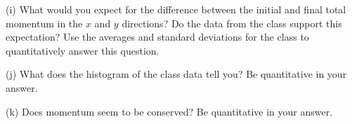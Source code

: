 (i) What would you expect for the difference between the initial and final total momentum in the $x$ and $y$ directions?
Do the data from the class support this expectation? 
Use the averages and standard deviations for the class to quantitatively answer this question.
\vspace{20mm}

(j) What does the histogram of the class data tell you? Be quantitative in your answer.
\vspace{20mm}

(k) Does momentum seem to be conserved? Be quantitative in your answer.
